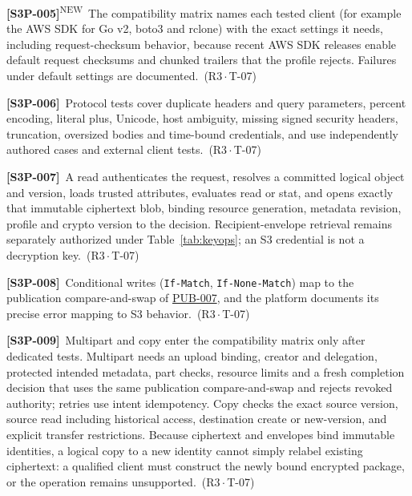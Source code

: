 \documentclass[11pt,a4paper]{article}
\newcommand{\code}[1]{{\small\nolinkurl{#1}}}
\newcommand{\rr}[1]{\hyperlink{req:#1}{#1}}
\newcommand{\reqtag}[2]{{\footnotesize\color{accent}(#1\,$\cdot$\,#2)}}
\newcommand{\req}[4]{\par\noindent\hypertarget{req:#1}{\textbf{[#1]}}\ #4\ \reqtag{#2}{#3}\par}
\newcommand{\reqn}[4]{\par\noindent\hypertarget{req:#1}{\textbf{[#1]}}\textsuperscript{\color{accent}\tiny NEW}\ #4\ \reqtag{#2}{#3}\par}
\begin{document}
\reqn{S3P-005}{R3}{T-07}{The compatibility matrix names each tested client (for example the AWS SDK for Go v2, boto3 and rclone) with the exact settings it needs, including request-checksum behavior, because recent AWS SDK releases enable default request checksums and chunked trailers that the profile rejects. Failures under default settings are documented.}
\req{S3P-006}{R3}{T-07}{Protocol tests cover duplicate headers and query parameters, percent encoding, literal plus, Unicode, host ambiguity, missing signed security headers, truncation, oversized bodies and time-bound credentials, and use independently authored cases and external client tests.}
\req{S3P-007}{R3}{T-07}{A read authenticates the request, resolves a committed logical object and version, loads trusted attributes, evaluates read or stat, and opens exactly that immutable ciphertext blob, binding resource generation, metadata revision, profile and crypto version to the decision. Recipient-envelope retrieval remains separately authorized under Table~\ref{tab:keyops}; an S3 credential is not a decryption key.}
\req{S3P-008}{R3}{T-07}{Conditional writes (\code{If-Match}, \code{If-None-Match}) map to the publication compare-and-swap of \rr{PUB-007}, and the platform documents its precise error mapping to S3 behavior.}
\req{S3P-009}{R3}{T-07}{Multipart and copy enter the compatibility matrix only after dedicated tests. Multipart needs an upload binding, creator and delegation, protected intended metadata, part checks, resource limits and a fresh completion decision that uses the same publication compare-and-swap and rejects revoked authority; retries use intent idempotency. Copy checks the exact source version, source read including historical access, destination create or new-version, and explicit transfer restrictions. Because ciphertext and envelopes bind immutable identities, a logical copy to a new identity cannot simply relabel existing ciphertext: a qualified client must construct the newly bound encrypted package, or the operation remains unsupported.}
\end{document}
